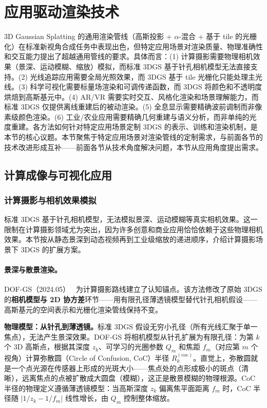 \section{应用驱动渲染技术}
\label{sec:02_11}

3D Gaussian Splatting 的通用渲染管线（高斯投影 + $\alpha$-混合 + 基于 tile 的光栅化）在标准新视角合成任务中表现出色，但特定应用场景对渲染质量、物理准确性和交互能力提出了超越通用管线的要求。具体而言：(1) 计算摄影需要物理相机效果（景深、运动模糊、缩放）模拟，而标准 3DGS 基于针孔相机模型无法直接支持。(2) 光线追踪应用需要全局光照效果，而 3DGS 基于 tile 光栅化只能处理主光线。(3) 科学可视化需要标量场渲染和可调传递函数，而 3DGS 将颜色和不透明度烘焙到高斯基元中。(4) AR/VR 需要实时交互、风格化渲染和场景理解能力，而标准 3DGS 仅提供离线重建后的被动渲染。(5) 全息显示需要精确波前调制而非像素级颜色渲染。(6) 工业/农业应用需要精确几何重建与语义分析，而非单纯的光度重建。各方法如何针对特定应用场景定制 3DGS 的表示、训练和渲染机制，是本节的核心议题。本节聚焦于特定应用场景对渲染管线的定制需求，与前面各节的技术改进形成互补——前面各节从技术角度解决问题，本节从应用角度提出需求。

\subsection{计算成像与可视化应用}

\subsubsection{计算摄影与相机效果模拟}

标准 3DGS 基于针孔相机模型，无法模拟景深、运动模糊等真实相机效果。这一限制在计算摄影领域尤为突出，因为许多创意和商业应用恰恰依赖于这些物理相机效果。本节按从静态景深到动态视频再到工业级缩放的递进顺序，介绍计算摄影场景下 3DGS 的扩展方案。

\paragraph{景深与散景渲染。}

DOF-GS（2024.05）~\cite{2405_17351} 为计算摄影路线建立了认知锚点。该方法修改了原始 3DGS 的\textbf{相机模型与 2D 协方差}环节——用有限孔径薄透镜模型替代针孔相机假设——高斯基元的空间表示和光栅化渲染管线保持不变。

\textbf{物理模型：从针孔到薄透镜。}标准 3DGS 假设无穷小孔径（所有光线汇聚于单一焦点），无法产生景深效果。DOF-GS 将相机模型从针孔扩展为有限孔径：为第 $k$ 个 3D 高斯点，根据其深度 $z_k$、可学习的光圈参数 $Q_m$ 和焦距 $f_m$（对应第 $m$ 个视角）计算弥散圆（Circle of Confusion, CoC）半径 $R_k^{(\text{coc})}$。直觉上，弥散圆就是一个点光源在传感器上形成的光斑大小——焦点处的点形成极小的斑点（清晰），远离焦点的点被扩散成大圆盘（模糊），这正是散景模糊的物理根源。CoC 半径的物理定义遵循薄透镜模型：当高斯深度 $z_k$ 偏离焦平面距离 $f_m$ 时，CoC 半径随 $|1/z_k - 1/f_m|$ 线性增长，由 $Q_m$ 控制整体缩放。

